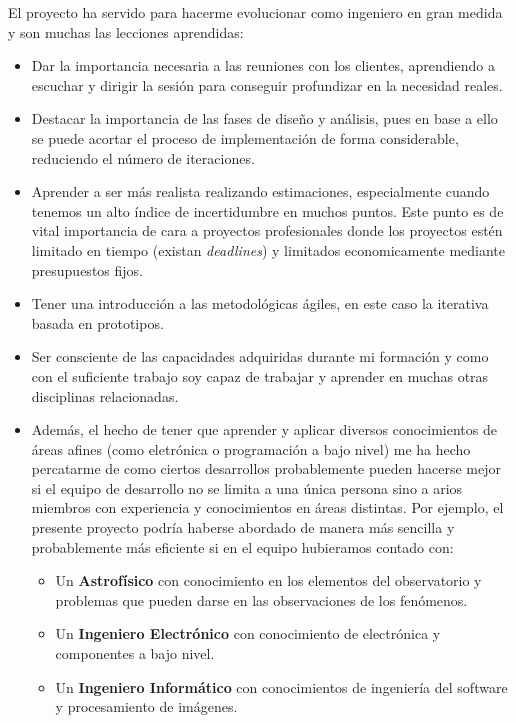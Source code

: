 El proyecto ha servido para hacerme evolucionar como ingeniero en gran medida y son muchas las lecciones aprendidas:

\begin{itemize}
	\item Dar la importancia necesaria a las reuniones con los clientes, aprendiendo a escuchar y dirigir la sesión para conseguir profundizar en la necesidad reales.
	\item Destacar la importancia de las fases de diseño y análisis, pues en base a ello se puede acortar el proceso de implementación de forma considerable, reduciendo el número de iteraciones. 
	\item Aprender a ser más realista realizando estimaciones, especialmente cuando tenemos un alto índice de incertidumbre en muchos puntos. Este punto es de vital importancia de cara a proyectos profesionales donde los proyectos estén limitado en tiempo (existan \textit{deadlines}) y limitados economicamente mediante presupuestos fijos.
	\item Tener una introducción a las metodológicas ágiles, en este caso la iterativa basada en prototipos.  
	\item Ser consciente de las capacidades adquiridas durante mi formación y como con el suficiente trabajo soy capaz de trabajar y aprender en muchas otras disciplinas relacionadas.
	\item Además, el hecho de tener que aprender y aplicar diversos conocimientos de áreas afines (como eletrónica o programación a bajo nivel) me ha hecho percatarme de como ciertos desarrollos probablemente pueden hacerse mejor si el equipo de desarrollo no se limita a una única persona sino a arios miembros con experiencia y conocimientos en áreas distintas. Por ejemplo, el presente proyecto podría haberse abordado de manera más sencilla y probablemente más eficiente si en el equipo hubieramos contado con:
	 
	 \begin{itemize}
	 	\item Un \textbf{Astrofísico}  con conocimiento en los elementos del observatorio y problemas que pueden darse en las observaciones de los fenómenos.
	 	\item Un \textbf{Ingeniero Electrónico} con conocimiento de electrónica y componentes a bajo nivel.
	 	\item Un \textbf{Ingeniero Informático} con conocimientos de ingeniería del software y procesamiento de imágenes. 
	 \end{itemize}
	 
\end{itemize}


